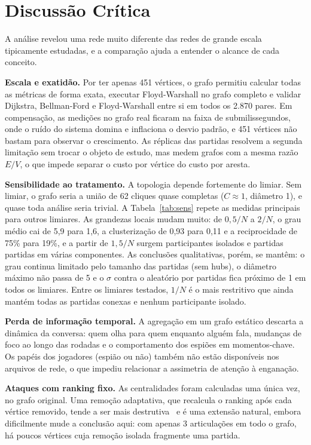 \documentclass[sigconf]{webmedia}
\begin{document}
\section{Discussão Crítica}
\label{sec:discussao}
A análise revelou uma rede muito diferente das redes de grande escala tipicamente estudadas, e a comparação ajuda a entender o alcance de cada conceito.

\textbf{Escala e exatidão.} Por ter apenas 451 vértices, o grafo permitiu calcular todas as métricas de forma exata, executar Floyd-Warshall no grafo completo e validar Dijkstra, Bellman-Ford e Floyd-Warshall entre si em todos os 2.870 pares. Em compensação, as medições no grafo real ficaram na faixa de submilissegundos, onde o ruído do sistema domina e inflaciona o desvio padrão, e 451 vértices não bastam para observar o crescimento. As réplicas das partidas resolvem a segunda limitação sem trocar o objeto de estudo, mas medem grafos com a mesma razão $E/V$, o que impede separar o custo por vértice do custo por aresta.

\textbf{Sensibilidade ao tratamento.} A topologia depende fortemente do limiar. Sem limiar, o grafo seria a união de 62 cliques quase completas ($C \approx 1$, diâmetro 1), e quase toda análise seria trivial. A Tabela~\ref{tab:sens} repete as medidas principais para outros limiares. As grandezas locais mudam muito: de $0{,}5/N$ a $2/N$, o grau médio cai de 5,9 para 1,6, a clusterização de 0,93 para 0,11 e a reciprocidade de 75\% para 19\%, e a partir de $1{,}5/N$ surgem participantes isolados e partidas partidas em várias componentes. As conclusões qualitativas, porém, se mantêm: o grau continua limitado pelo tamanho das partidas (sem hubs), o diâmetro máximo não passa de 5 e o $\sigma$ contra o aleatório por partidas fica próximo de 1 em todos os limiares. Entre os limiares testados, $1/N$ é o mais restritivo que ainda mantém todas as partidas conexas e nenhum participante isolado.

\textbf{Perda de informação temporal.} A agregação em um grafo estático descarta a dinâmica da conversa: quem olha para quem enquanto alguém fala, mudanças de foco ao longo das rodadas e o comportamento dos espiões em momentos-chave. Os papéis dos jogadores (espião ou não) também não estão disponíveis nos arquivos de rede, o que impediu relacionar a assimetria de atenção à enganação.

\textbf{Ataques com ranking fixo.} As centralidades foram calculadas uma única vez, no grafo original. Uma remoção adaptativa, que recalcula o ranking após cada vértice removido, tende a ser mais destrutiva~\cite{albert2000} e é uma extensão natural, embora dificilmente mude a conclusão aqui: com apenas 3 articulações em todo o grafo, há poucos vértices cuja remoção isolada fragmente uma partida.
\end{document}
